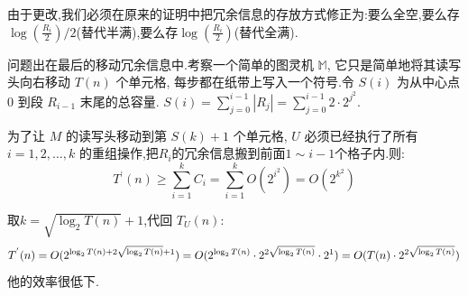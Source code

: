 \documentclass{homework}
\begin{document}
\begin{sol}
	由于更改,我们必须在原来的证明中把冗余信息的存放方式修正为:要么全空,要么存$\log(\frac{R_i}{2})/2$(替代半满),要么存$\log(\frac{R_i}{2})$(替代全满).
	
	问题出在最后的移动冗余信息中.考察一个简单的图灵机 $\mathbb{M}$, 它只是简单地将其读写头向右移动 $T(n)$ 个单元格, 每步都在纸带上写入一个符号.令 $S(i)$ 为从中心点 0 到段 $R_{i-1}$ 末尾的总容量.
	$S(i) = \sum_{j=0}^{i-1} |R_j| = \sum_{j=0}^{i-1} 2 \cdot 2^{j^2}$.
	
	为了让 $M$ 的读写头移动到第 $S(k)+1$ 个单元格, $U$ 必须已经执行了所有 $i=1, 2, \dots, k$ 的重组操作,把$R_i$的冗余信息搬到前面$1\sim i-1$个格子内.则:
	$$T^‘(n) \ge \sum_{i=1}^{k} C_i = \sum_{i=1}^{k} O(2^{i^2})= O(2^{k^2})$$
	
	取$k = \sqrt{\log_2 T(n)} + 1$,代回 $T_U(n)$:
		\begin{equation}
					T^{'} (n) =O(2^{\log_2 T(n) + 2\sqrt{\log_2 T(n)} + 1})\\
			= O(2^{\log_2 T(n)} \cdot 2^{2\sqrt{\log_2 T(n)}} \cdot 2^1)\\
			= O(T(n) \cdot 2^{2\sqrt{\log_2 T(n)}})\\
		\end{equation}
他的效率很低下.

\end{sol}
\end{document}
